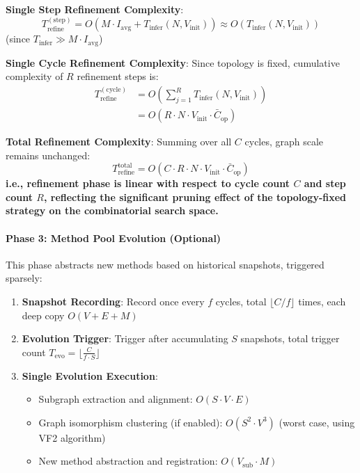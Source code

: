 \textbf{Single Step Refinement Complexity}:
\begin{equation}
    T_{\mathrm{refine}}^{(\mathrm{step})} = O(M \cdot I_{\mathrm{avg}} + T_{\mathrm{infer}}(N, V_{\mathrm{init}})) \approx O(T_{\mathrm{infer}}(N, V_{\mathrm{init}}))
\end{equation}
(since $T_{\mathrm{infer}} \gg M \cdot I_{\mathrm{avg}}$)

\textbf{Single Cycle Refinement Complexity}: Since topology is fixed, cumulative complexity of $R$ refinement steps is:
\begin{equation}
\begin{aligned}
    T_{\mathrm{refine}}^{(\mathrm{cycle})} &= O\left( \sum_{j=1}^{R} T_{\mathrm{infer}}(N, V_{\mathrm{init}}) \right) \\
    &= O\left(R \cdot N \cdot V_{\mathrm{init}} \cdot \bar{C}_{\mathrm{op}}\right)
\end{aligned}
\end{equation}

\textbf{Total Refinement Complexity}: Summing over all $C$ cycles, graph scale remains unchanged:
\begin{equation}
    T_{\mathrm{refine}}^{\mathrm{total}} = O\left( C \cdot R \cdot N \cdot V_{\mathrm{init}} \cdot \bar{C}_{\mathrm{op}} \right)
\end{equation}
\textbf{i.e., refinement phase is linear with respect to cycle count $C$ and step count $R$, reflecting the significant pruning effect of the topology-fixed strategy on the combinatorial search space.}

\paragraph{Phase 3: Method Pool Evolution (Optional)}
This phase abstracts new methods based on historical snapshots, triggered sparsely:
\begin{enumerate}
    \item \textbf{Snapshot Recording}: Record once every $f$ cycles, total $\lfloor C/f \rfloor$ times, each deep copy $O(V + E + M)$
    \item \textbf{Evolution Trigger}: Trigger after accumulating $S$ snapshots, total trigger count $T_{\mathrm{evo}} = \lfloor \frac{C}{f \cdot S} \rfloor$
    \item \textbf{Single Evolution Execution}:
    \begin{itemize}
        \item Subgraph extraction and alignment: $O(S \cdot V \cdot E)$
        \item Graph isomorphism clustering (if enabled): $O(S^2 \cdot V^3)$ (worst case, using VF2 algorithm)
        \item New method abstraction and registration: $O(V_{\mathrm{sub}} \cdot M)$
    \end{itemize}
\end{enumerate}

